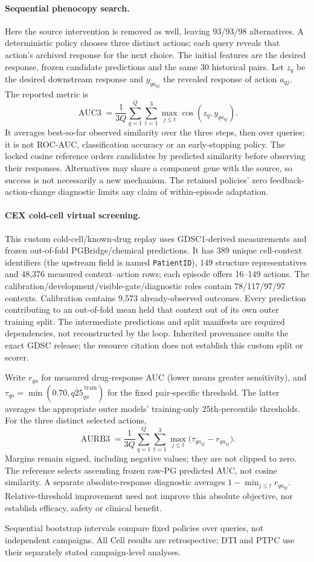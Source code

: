 \paragraph{Sequential phenocopy search.}
Here the source intervention is removed as well, leaving 93/93/98
alternatives. A deterministic policy chooses three distinct actions;
each query reveals that action's archived response for the next choice.
The initial features are the desired response, frozen candidate predictions
and the same 30 historical pairs. Let $z_q$ be the desired downstream
response and $y_{qa_{qj}}$ the revealed response of action $a_{qj}$.
The reported metric is
\[
\operatorname{AUC3}=\frac{1}{3Q}\sum_{q=1}^{Q}\sum_{t=1}^{3}
 \max_{j\leq t}\operatorname{cos}(z_q,y_{qa_{qj}}).
\]
It averages best-so-far observed similarity over the three steps, then over
queries; it is not ROC-AUC, classification accuracy or an early-stopping
policy. The locked cosine reference orders candidates by predicted
similarity before observing their responses. Alternatives may share a
component gene with the source, so success is not necessarily a new
mechanism. The retained policies' zero feedback-action-change diagnostic
limits any claim of within-episode adaptation.

\paragraph{CEX cold-cell virtual screening.}
This custom cold-cell/known-drug replay uses GDSC1-derived measurements
\citep{yang2013gdsc} and frozen out-of-fold PGBridge/chemical predictions. It has
389 unique cell-context identifiers (the upstream field is named
\texttt{PatientID}), 149 structure representatives and 48,376 measured
context--action rows; each episode offers 16--149 actions. The
calibration/development/visible-gate/diagnostic roles contain 78/117/97/97
contexts. Calibration contains 9,573 already-observed outcomes. Every
prediction contributing to an out-of-fold mean held that context out of
its own outer training split. The intermediate predictions and split
manifests are required dependencies, not reconstructed by the loop.
Inherited provenance omits the exact GDSC release; the resource citation
does not establish this custom split or scorer.

Write $r_{qa}$ for measured drug-response AUC (lower means greater
sensitivity), and $\tau_{qa}=\min(0.70,\overline{q25}^{\,\mathrm{train}}_{qa})$
for the fixed pair-specific threshold. The latter averages the appropriate
outer models' training-only 25th-percentile thresholds. For the three
distinct selected actions,
\[
\operatorname{AURB3}=\frac{1}{3Q}\sum_{q=1}^{Q}\sum_{t=1}^{3}
 \max_{j\leq t}\bigl(\tau_{qa_{qj}}-r_{qa_{qj}}\bigr).
\]
Margins remain signed, including negative values; they are not clipped to
zero. The reference selects ascending frozen raw-PG predicted AUC, not
cosine similarity. A separate absolute-response diagnostic averages
$1-\min_{j\leq t}r_{qa_{qj}}$. Relative-threshold improvement need not improve
this absolute objective, nor establish efficacy, safety or clinical benefit.

Sequential bootstrap intervals compare fixed policies over queries, not
independent campaigns. All Cell results are retrospective; DTI and PTPC
use their separately stated campaign-level analyses.

